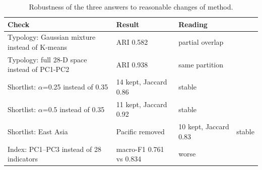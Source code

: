 \begin{table}[t]
\centering
\caption{Robustness of the three answers to reasonable changes of method.}
\label{tab:robustness}
\small
\begin{tabular}{lll}
\toprule
\textbf{Check} & \textbf{Result} & \textbf{Reading} \\
\midrule
Typology: Gaussian mixture instead of K-means & ARI 0.582 & partial overlap \\
Typology: full 28-D space instead of PC1-PC2 & ARI 0.938 & same partition \\
Shortlist: $\alpha$=0.25 instead of 0.35 & 14 kept, Jaccard 0.86 & stable \\
Shortlist: $\alpha$=0.5 instead of 0.35 & 11 kept, Jaccard 0.92 & stable \\
Shortlist: East Asia & Pacific removed & 10 kept, Jaccard 0.83 & stable \\
Index: PC1--PC3 instead of 28 indicators & macro-F1 0.761 vs 0.834 & worse \\
\bottomrule
\end{tabular}
\end{table}
